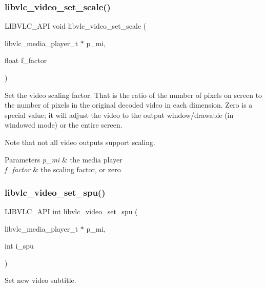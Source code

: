 \subsubsection{\texorpdfstring{libvlc\+\_\+video\+\_\+set\+\_\+scale()}{libvlc\_video\_set\_scale()}}
{\footnotesize\ttfamily L\+I\+B\+V\+L\+C\+\_\+\+A\+PI void libvlc\+\_\+video\+\_\+set\+\_\+scale (\begin{DoxyParamCaption}\item[{libvlc\+\_\+media\+\_\+player\+\_\+t $\ast$}]{p\+\_\+mi,  }\item[{float}]{f\+\_\+factor }\end{DoxyParamCaption})}

Set the video scaling factor. That is the ratio of the number of pixels on screen to the number of pixels in the original decoded video in each dimension. Zero is a special value; it will adjust the video to the output window/drawable (in windowed mode) or the entire screen.

Note that not all video outputs support scaling.


\begin{DoxyParams}{Parameters}
{\em p\+\_\+mi} & the media player \\
\hline
{\em f\+\_\+factor} & the scaling factor, or zero \\
\hline
\end{DoxyParams}
\mbox{\label{group__libvlc__video_gac0594ad8db60a38a19eca5858f087e9d}} 
\subsubsection{\texorpdfstring{libvlc\+\_\+video\+\_\+set\+\_\+spu()}{libvlc\_video\_set\_spu()}}
{\footnotesize\ttfamily L\+I\+B\+V\+L\+C\+\_\+\+A\+PI int libvlc\+\_\+video\+\_\+set\+\_\+spu (\begin{DoxyParamCaption}\item[{libvlc\+\_\+media\+\_\+player\+\_\+t $\ast$}]{p\+\_\+mi,  }\item[{int}]{i\+\_\+spu }\end{DoxyParamCaption})}

Set new video subtitle.


